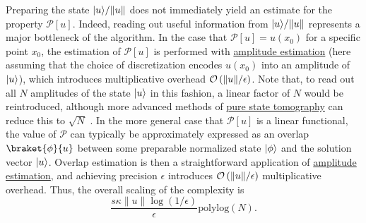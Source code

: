 \begin{refsection}
Preparing the state $\lvert u\rangle/\lVert u \rVert$ does not immediately yield an estimate for the property $\mathcal{P}[u]$. Indeed, reading out useful information from $\lvert u\rangle/\lVert u \rVert$ represents a major bottleneck of the algorithm. In the case that $\mathcal{P}[u] = u(x_0)$ for a specific point $x_0$, the estimation of $\mathcal{P}[u]$ is performed with \hyperref[prim:AmpEst]{amplitude estimation} (here assuming that the choice of discretization encodes $u(x_0)$ into an amplitude of $\lvert u\rangle$), which introduces multiplicative overhead $\mathcal{O}\left( \lVert u \rVert /\epsilon \right)$. Note that, to read out all $N$ amplitudes of the state $\lvert u\rangle$ in this fashion, a linear factor of $N$ would be reintroduced, although more advanced methods of \hyperref[prim:Tomography]{pure state tomography} can reduce this to $\sqrt{N}$ \cite{apeldoorn2022TomographyStatePreparationUnitaries}. In the more general case that $\mathcal{P}[u]$ is a linear functional, the value of $\mathcal{P}$ can typically be approximately expressed as an overlap $\braket{\phi}{u}$ between some preparable normalized state $\lvert\phi\rangle$ and the solution vector $\lvert u\rangle$. Overlap estimation is then a straightforward application of \hyperref[prim:AmpEst]{amplitude estimation}, and achieving precision $\epsilon$ introduces $\mathcal{O}\left( \lVert u \rVert /\epsilon \right)$ multiplicative overhead. Thus, the overall scaling of the complexity is
\begin{equation}
    \frac{s\kappa \lVert u \rVert \log(1/\epsilon) }{\epsilon} \mathrm{polylog}(N).
\end{equation}


\end{refsection}
